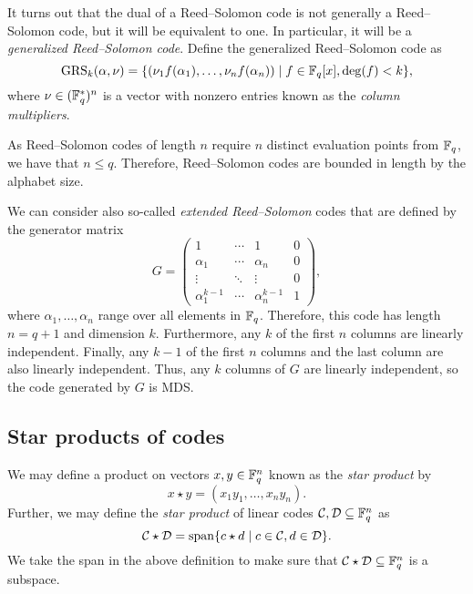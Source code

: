 \documentclass[../main.tex]{subfiles}
\begin{document}
It turns out that the dual of a Reed--Solomon code is not generally a Reed--Solomon code, but it will be equivalent to one. In particular, it will be a \emph{generalized Reed--Solomon code}. Define the generalized Reed--Solomon code as
\begin{equation*}
    \operatorname{GRS}_k(\alpha, \nu) = \{(\nu_1 f(\alpha_1), \dots, \nu_n f(\alpha_n)) \mid f \in \mathbb{F}_q[x], \deg(f) < k \},
\end{equation*}
where $\nu \in (\mathbb{F}_q^*)^n$ is a vector with nonzero entries known as the \emph{column multipliers}.

As Reed--Solomon codes of length $n$ require $n$ distinct evaluation points from $\mathbb{F}_q$, we have that $n \leq q$. Therefore, Reed--Solomon codes are bounded in length by the alphabet size.

We can consider also so-called \emph{extended Reed--Solomon} codes that are defined by the generator matrix
\begin{equation*}
    G = 
    \begin{pmatrix}
        1 & \cdots & 1 & 0\\
        \alpha_1 & \cdots & \alpha_n & 0 \\
        \vdots & \ddots & \vdots & 0 \\
        \alpha_1^{k-1} & \cdots & \alpha_n^{k-1} & 1
    \end{pmatrix},
\end{equation*}
where $\alpha_1, \dots, \alpha_n$ range over all elements in $\mathbb{F}_q$. Therefore, this code has length $n = q + 1$ and dimension $k$. Furthermore, any $k$ of the first $n$ columns are linearly independent. Finally, any $k - 1$ of the first $n$ columns and the last column are also linearly independent. Thus, any $k$ columns of $G$ are linearly independent, so the code generated by $G$ is MDS.

\subsection{Star products of codes}

We may define a product on vectors $x, y \in \mathbb{F}_q^n$ known as the \emph{star product} by
\begin{equation*}
    x \star y = (x_1y_1, \dots, x_ny_n).
\end{equation*}
Further, we may define the \emph{star product} of linear codes $\mathcal{C}, \mathcal{D} \subseteq \mathbb{F}_q^n$ as
\begin{equation*}
    \mathcal{C} \star \mathcal{D} = \operatorname{span}\{ c \star d \mid c \in \mathcal{C}, d \in \mathcal{D} \}.
\end{equation*}
We take the span in the above definition to make sure that $\mathcal{C} \star \mathcal{D} \subseteq \mathbb{F}_q^n$ is a subspace.
\end{document}
